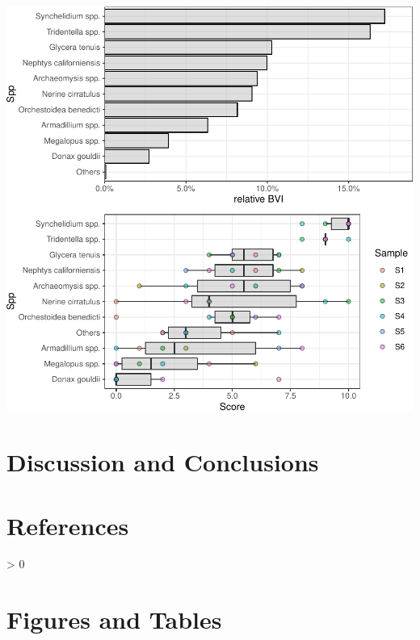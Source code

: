 \documentclass[
]{article}
\newlength{\cslhangindent}
\newenvironment{CSLReferences}[2] %
 {%
  \setlength{\parindent}{0pt}
  \ifodd #1 \everypar{\setlength{\hangindent}{\cslhangindent}}\ignorespaces\fi
  \ifnum #2 > 0
  \setlength{\parskip}{#2\baselineskip}
  \fi
 }%
 {}
\begin{document}
\includegraphics{manuscript_files/figure-latex/unnamed-chunk-8-1.pdf}

\hypertarget{discussion-and-conclusions}{%
\section{Discussion and Conclusions}\label{discussion-and-conclusions}}

\hypertarget{references}{%
\section{References}\label{references}}

\hypertarget{refs}{}
\begin{CSLReferences}{0}{0}
\end{CSLReferences}

\hypertarget{figures-and-tables}{%
\section{Figures and Tables}\label{figures-and-tables}}
\end{document}
